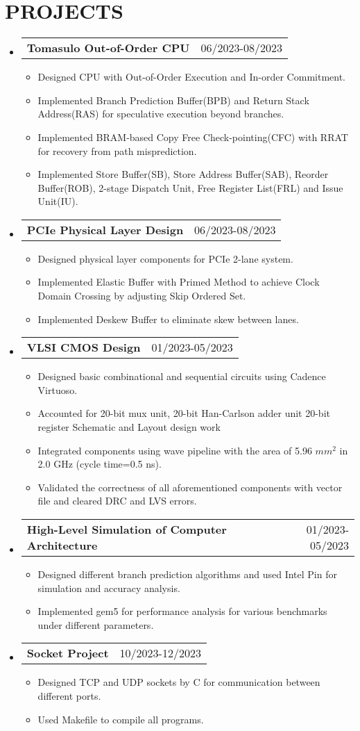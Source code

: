 \documentclass[letterpaper,11pt]{article}
\makeatletter
\newcommand{\resumeItemOne}[1]{
  \item\small{#1}
}
\newcommand{\resumeSubheadingNoTitle}[2]{
  \vspace{-1pt}\item
    \begin{tabular*}{0.97\textwidth}[t]{l@{\extracolsep{\fill}}r}
      \textbf{#1} & #2 %
    \end{tabular*}\vspace{-5pt}
}
\newcommand{\resumeSubHeadingListStart}{\begin{itemize}[leftmargin=*]}
\newcommand{\resumeSubHeadingListEnd}{\end{itemize}\vspace{-5pt}}
\newcommand{\resumeItemListStart}{\begin{itemize}}
\newcommand{\resumeItemListEnd}{\end{itemize}\vspace{-10pt}}
\makeatother
\begin{document}
\section{PROJECTS}
\resumeSubHeadingListStart
\resumeSubheadingNoTitle
    {Tomasulo Out-of-Order CPU}{06/2023-08/2023}
\resumeItemListStart
	\resumeItemOne{Designed CPU with Out-of-Order Execution and In-order Commitment.}
	\resumeItemOne{Implemented Branch Prediction Buffer(BPB) and Return Stack Address(RAS) for speculative execution beyond branches.}
	\resumeItemOne{Implemented BRAM-based Copy Free Check-pointing(CFC) with RRAT for recovery from path misprediction.}
	\resumeItemOne{Implemented Store Buffer(SB), Store Address Buffer(SAB), Reorder Buffer(ROB), 2-stage Dispatch Unit, Free Register List(FRL) and Issue Unit(IU).}
\resumeItemListEnd
\resumeSubheadingNoTitle
    {PCIe Physical Layer Design}{06/2023-08/2023}
\resumeItemListStart
	\resumeItemOne{Designed physical layer components for PCIe 2-lane system.}
	\resumeItemOne{Implemented Elastic Buffer with Primed Method to achieve Clock Domain Crossing by adjusting Skip Ordered Set.}
	\resumeItemOne{Implemented Deskew Buffer to eliminate skew between lanes.}
\resumeItemListEnd
\resumeSubheadingNoTitle
    {VLSI CMOS Design}{01/2023-05/2023}
\resumeItemListStart
	\resumeItemOne{Designed basic combinational and sequential circuits using Cadence Virtuoso.}
	\resumeItemOne{Accounted for 20-bit mux unit, 20-bit Han-Carlson adder unit 20-bit register Schematic and Layout design work}
	\resumeItemOne{Integrated components using wave pipeline with the area of 5.96 $mm^2$ in 2.0 GHz (cycle time=0.5 ns).}
	\resumeItemOne{Validated the correctness of all aforementioned components with vector file and cleared DRC and LVS errors.}
\resumeItemListEnd
\resumeSubheadingNoTitle
    {High-Level Simulation of Computer Architecture}{01/2023-05/2023}
\resumeItemListStart
	\resumeItemOne{Designed different branch prediction algorithms and used Intel Pin for simulation and accuracy analysis.}
	\resumeItemOne{Implemented gem5 for performance analysis for various benchmarks under different parameters.}
\resumeItemListEnd
\resumeSubheadingNoTitle
    {Socket Project}{10/2023-12/2023}
\resumeItemListStart
	\resumeItemOne{Designed TCP and UDP sockets by C for communication between different ports.}
	\resumeItemOne{Used Makefile to compile all programs.}
\resumeItemListEnd
\resumeSubHeadingListEnd
\end{document}

